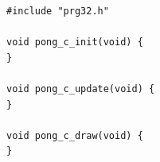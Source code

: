 \begin{lstlisting}[style=c,caption={The smallest C game. Three functions that do nothing yet: the C counterpart of the assembly skeleton in Chapter~\ref{ch:asm1}.}]
#include "prg32.h"

void pong_c_init(void) {
}

void pong_c_update(void) {
}

void pong_c_draw(void) {
}
\end{lstlisting}